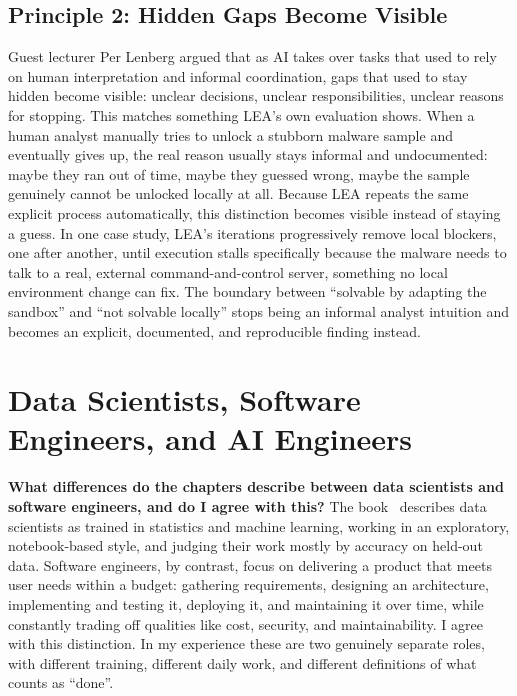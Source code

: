 \documentclass[11pt,a4paper]{article}
\begin{document}
\subsection{Principle 2: Hidden Gaps Become Visible}

Guest lecturer Per Lenberg argued that as AI takes over tasks that used to rely on human interpretation and informal coordination, gaps that used to stay hidden become visible: unclear decisions, unclear responsibilities, unclear reasons for stopping.
This matches something LEA's own evaluation shows.
When a human analyst manually tries to unlock a stubborn malware sample and eventually gives up, the real reason usually stays informal and undocumented: maybe they ran out of time, maybe they guessed wrong, maybe the sample genuinely cannot be unlocked locally at all.
Because LEA repeats the same explicit process automatically, this distinction becomes visible instead of staying a guess.
In one case study, LEA's iterations progressively remove local blockers, one after another, until execution stalls specifically because the malware needs to talk to a real, external command-and-control server, something no local environment change can fix.
The boundary between ``solvable by adapting the sandbox'' and ``not solvable locally'' stops being an informal analyst intuition and becomes an explicit, documented, and reproducible finding instead.

\section{Data Scientists, Software Engineers, and AI Engineers}

\textbf{What differences do the chapters describe between data scientists and software engineers, and do I agree with this?}
The book~\cite{kaestner2025} describes data scientists as trained in statistics and machine learning, working in an exploratory, notebook-based style, and judging their work mostly by accuracy on held-out data.
Software engineers, by contrast, focus on delivering a product that meets user needs within a budget: gathering requirements, designing an architecture, implementing and testing it, deploying it, and maintaining it over time, while constantly trading off qualities like cost, security, and maintainability.
I agree with this distinction.
In my experience these are two genuinely separate roles, with different training, different daily work, and different definitions of what counts as ``done''.
\end{document}
